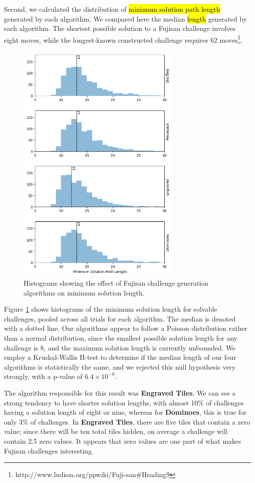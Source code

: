 \documentclass[journal]{IEEEtran}
\begin{document}
Second, we calculated the distribution of \hl{minimum solution path length} generated by each algorithm. We compared here the median \hl{length} generated by each algorithm. The shortest possible solution to a Fujisan challenge involves eight moves, while 
the longest-known constructed challenge requires 62 moves\footnote{http://www.ludism.org/ppwiki/Fuji-san\#Heading9}.

\begin{figure}[t]
\centering
\includegraphics[width=8cm]{figure17.png}
\caption{Histograms showing the effect of Fujisan challenge generation algorithms on minimum solution length.}
\label{fig:difficultycomp}
\end{figure}

Figure \ref{fig:difficultycomp} shows histograms of the minimum solution length for solvable challenges, pooled across all trials for each algorithm. The median is denoted with a dotted line. Our algorithms appear to follow a Poisson distribution rather than a normal distribution, since the smallest possible solution length for any challenge is 8, and the maximum solution length is currently unbounded. We employ a Kruskal-Wallis H-test \cite{KRUSKAL} to determine if the median length of our four algorithms is statistically the same, and we rejected this null hypothesis very strongly, with a p-value of $6.4 \times 10^{-9}$.

The algorithm responsible for this result was {\bf Engraved Tiles}. We can see a strong tendency to have shorter solution lengths, with almost 10\% of challenges having a solution length of eight or nine, whereas for {\bf Dominoes}, this is true for only 3\% of challenges. In {\bf Engraved Tiles}, there are five tiles that contain a zero value; since there will be ten total tiles hidden, on average a challenge will contain 2.5 zero values. It appears that zero values are one part of what makes Fujisan challenges interesting.
\end{document}
